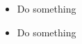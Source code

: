 \documentclass[10pt,a4paper]{Protocol}
\begin{document}
\begin{itemize}
	\item Do something
\end{itemize}
\divider

\begin{itemize}
	\item Do something
\end{itemize}



\end{document}
